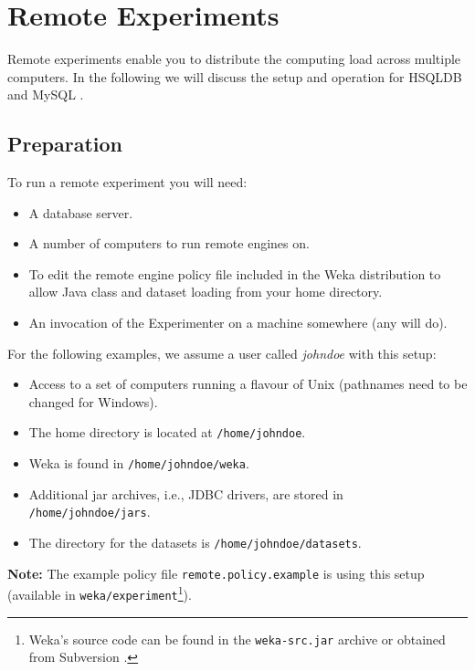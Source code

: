 \newpage
\section{Remote Experiments}

Remote experiments enable you to distribute the computing load across multiple computers. In the following we will discuss the setup and operation for HSQLDB \cite{hsql} and MySQL \cite{mysql}.

\subsection{Preparation}

To run a remote experiment you will need:

\begin{itemize}
   \item A database server.
   \item A number of computers to run remote engines on.
   \item To edit the remote engine policy file included in the Weka distribution to allow Java class and dataset loading from your home directory.
   \item An invocation of the Experimenter on a machine somewhere (any will do).
\end{itemize}

\noindent For the following examples, we assume a user called \textit{johndoe} with this setup:

\begin{itemize}
	\item Access to a set of computers running a flavour of Unix (pathnames need to be changed for Windows).
   \item The home directory is located at \texttt{/home/johndoe}.
   \item Weka is found in \texttt{/home/johndoe/weka}.
   \item Additional jar archives, i.e., JDBC drivers, are stored in \texttt{/home/johndoe/jars}.
   \item The directory for the datasets is \texttt{/home/johndoe/datasets}.
\end{itemize}

\noindent \textbf{Note:} The example policy file \texttt{remote.policy.example} is using this setup (available in \texttt{weka/experiment}\footnote{Weka's source code can be found in the \texttt{weka-src.jar} archive or obtained from Subversion \cite{subversion}.}).

